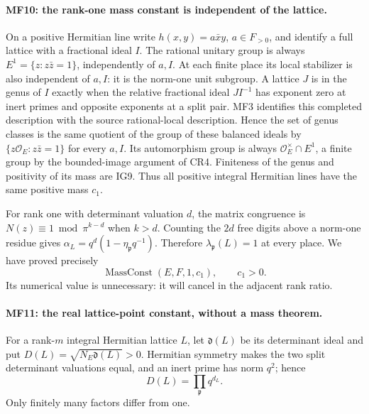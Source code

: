 \paragraph{MF10: the rank-one mass constant is independent of the lattice.}
On a positive Hermitian line write \(h(x,y)=a\bar x y\), \(a\in
F_{>0}\), and identify a full lattice with a fractional ideal \(I\).
The rational unitary group is always
\(E^1=\{z:z\bar z=1\}\), independently of \(a,I\).
At each finite place its local stabilizer is also independent of
\(a,I\): it is the norm-one unit subgroup.
A lattice \(J\) is in the genus of \(I\) exactly when the relative
fractional ideal \(JI^{-1}\) has exponent zero at inert primes and
opposite exponents at a split pair. MF3 identifies this completed
description with the source rational-local description.
Hence the set of genus classes is the same quotient of the group
of these balanced ideals by \(\{z\mathcal O_E:z\bar z=1\}\)
for every \(a,I\). Its automorphism group is always
\(\mathcal O_E^\times\cap E^1\), a finite group by the bounded-image
argument of CR4. Finiteness of the genus and positivity of its mass
are IG9. Thus all positive integral Hermitian lines have the same
positive mass \(c_1\).

For rank one with determinant valuation \(d\), the matrix congruence
is \(N(z)\equiv1\bmod\pi^{k-d}\) when \(k>d\).
Counting the \(2d\) free digits above a norm-one residue gives
\(\alpha_L=q^d(1-\eta_{\mathfrak p}q^{-1})\).
Therefore \(\lambda_{\mathfrak p}(L)=1\) at every place.
We have proved precisely
\[
                  \operatorname{MassConst}(E,F,1,c_1),\qquad c_1>0.
                                                               \tag{MF.22}
\]
Its numerical value is unnecessary: it will cancel in the adjacent
rank ratio.

\paragraph{MF11: the real lattice-point constant, without a mass theorem.}
For a rank-\(m\) integral Hermitian lattice \(L\), let
\(\mathfrak d(L)\) be its determinant ideal and put
\(D(L)=\sqrt{N_E\mathfrak d(L)}>0\).
Hermitian symmetry makes the two split determinant valuations
equal, and an inert prime has norm \(q^2\); hence
\[
                         D(L)=\prod_{\mathfrak p}q^{d_L}.        \tag{MF.23}
\]
Only finitely many factors differ from one.

